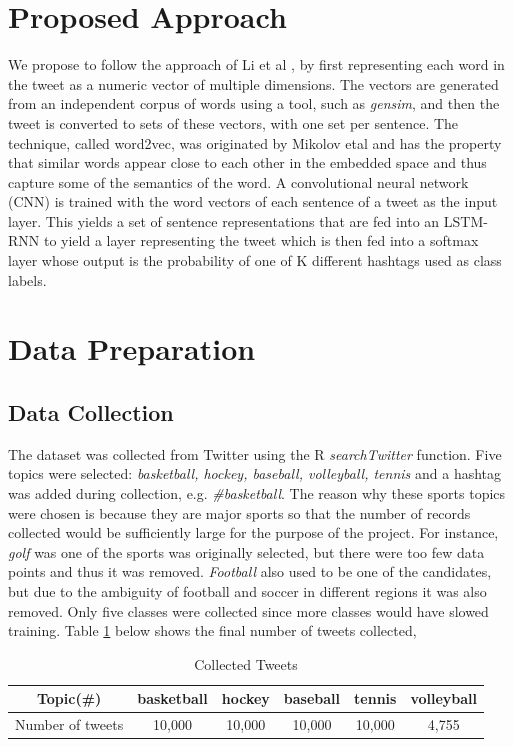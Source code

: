 \documentclass[journal, a4paper]{IEEEtran}
\begin{document}
\section{Proposed Approach}
We propose to follow the approach of Li et al \cite{Li-lstm}, by first representing each word in the tweet as a numeric vector of multiple dimensions. The vectors are generated from an independent corpus of words using a tool, such as \textit{gensim}, and then the tweet is converted to sets of these vectors, with one set per sentence. The technique, called word2vec, was originated by Mikolov etal \cite{word2vec} and has the property that similar words appear close to each other in the embedded space and thus capture some of the semantics of the word.
A convolutional neural network (CNN) is trained with the word vectors of each sentence of a tweet as the input layer. This yields a set of sentence representations that are fed into an LSTM-RNN to yield a layer representing the tweet which is then fed into a softmax layer whose output is the probability of one of K different hashtags used as class labels.
\section{Data Preparation}
\subsection{Data Collection}
The dataset was collected from Twitter using the R \textit{searchTwitter} function. Five topics were selected: {\em basketball, hockey, baseball, volleyball, tennis} and a hashtag was added during collection, e.g. \textit{\#basketball}. The reason why these sports topics were chosen is because they are major sports so that the number of records collected would be sufficiently large for the purpose of the project. For instance, \textit{golf} was one of the sports was originally selected, but there were too few data points and thus it was removed. \textit{Football} also used to be one of the candidates, but due to the ambiguity of football and soccer in different regions it was also removed. Only five classes were collected since more classes would have slowed training. Table \ref{Tab:1} below shows the final number of tweets collected,
\begin{table}[ht]
	\begin{center}
		\begin{tabular}{|c|c|c|c|c|c|}
			\hline\hline
			Topic(\#) & basketball & hockey & baseball &tennis &volleyball\\
			\hline
			Number of tweets & 10,000 & 10,000 & 10,000 & 10,000 & 4,755\\
			\hline
		\end{tabular}
	\end{center}
	\caption{Collected Tweets}\label{Tab:1}
\end{table}
\end{document}
